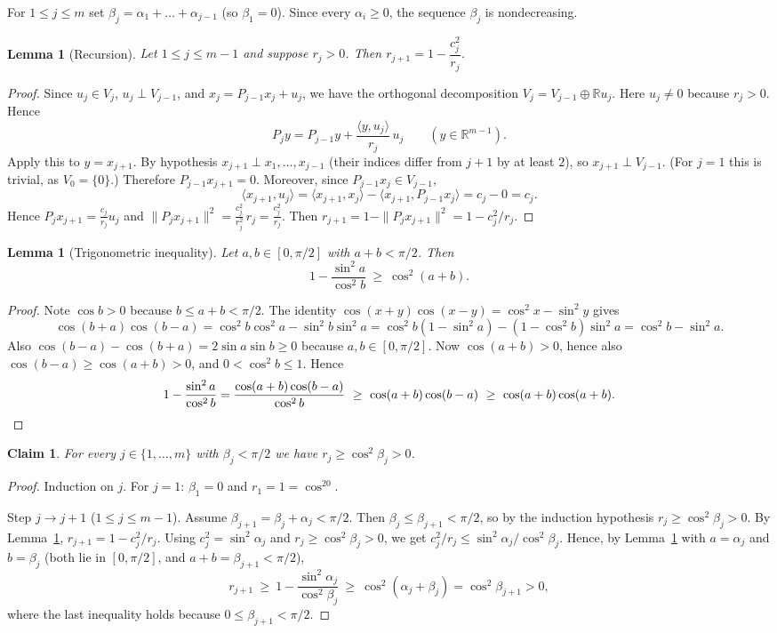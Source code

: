 \documentclass[11pt]{article}
\newtheorem{lemma}[theorem]{Lemma}
\newtheorem{claim}[theorem]{Claim}
\theoremstyle{remark}
\theoremstyle{definition}
\newcommand{\ip}[2]{\langle #1,#2\rangle}
\begin{document}
For $1\le j\le m$ set $\beta_j=\alpha_1+\dots+\alpha_{j-1}$ (so $\beta_1=0$). Since every $\alpha_i\ge0$,
the sequence $\beta_j$ is nondecreasing.

\begin{lemma}[Recursion]\label{lem:rec}
Let $1\le j\le m-1$ and suppose $r_j>0$. Then $r_{j+1}=1-\dfrac{c_j^2}{r_j}$.
\end{lemma}

\begin{proof}
Since $u_j\in V_j$, $u_j\perp V_{j-1}$, and $x_j=P_{j-1}x_j+u_j$, we have the orthogonal
decomposition $V_j=V_{j-1}\oplus\mathbb{R}u_j$. Here $u_j\ne0$ because $r_j>0$. Hence
\[
  P_jy=P_{j-1}y+\frac{\ip{y}{u_j}}{r_j}\,u_j\qquad(y\in\mathbb{R}^{m-1}).
\]
Apply this to $y=x_{j+1}$. By hypothesis $x_{j+1}\perp x_1,\dots,x_{j-1}$ (their indices differ from
$j+1$ by at least $2$), so $x_{j+1}\perp V_{j-1}$. (For $j=1$ this is trivial, as $V_0=\{0\}$.)
Therefore $P_{j-1}x_{j+1}=0$. Moreover, since $P_{j-1}x_j\in V_{j-1}$,
\[
  \ip{x_{j+1}}{u_j}=\ip{x_{j+1}}{x_j}-\ip{x_{j+1}}{P_{j-1}x_j}=c_j-0=c_j .
\]
Hence $P_jx_{j+1}=\frac{c_j}{r_j}u_j$ and $\|P_jx_{j+1}\|^2=\frac{c_j^2}{r_j^2}\,r_j=\frac{c_j^2}{r_j}$.
Then $r_{j+1}=1-\|P_jx_{j+1}\|^2=1-c_j^2/r_j$.
\end{proof}

\begin{lemma}[Trigonometric inequality]\label{lem:trig}
Let $a,b\in[0,\pi/2]$ with $a+b<\pi/2$. Then
\[
  1-\frac{\sin^2a}{\cos^2b}\ \ge\ \cos^2(a+b).
\]
\end{lemma}

\begin{proof}
Note $\cos b>0$ because $b\le a+b<\pi/2$. The identity $\cos(x+y)\cos(x-y)=\cos^2x-\sin^2y$ gives
\[
  \cos(b+a)\cos(b-a)=\cos^2b\cos^2a-\sin^2b\sin^2a
  =\cos^2b(1-\sin^2a)-(1-\cos^2b)\sin^2a=\cos^2b-\sin^2a .
\]
Also $\cos(b-a)-\cos(b+a)=2\sin a\sin b\ge0$ because $a,b\in[0,\pi/2]$. Now $\cos(a+b)>0$, hence also $\cos(b-a)\ge\cos(a+b)>0$, and
$0<\cos^2b\le1$. Hence
\[
  1-\frac{\sin^2a}{\cos^2b}=\frac{\cos(a+b)\cos(b-a)}{\cos^2b}
  \ \ge\ \cos(a+b)\cos(b-a)\ \ge\ \cos(a+b)\cos(a+b).\qedhere
\]
\end{proof}

\begin{claim}\label{cl:ind}
For every $j\in\{1,\dots,m\}$ with $\beta_j<\pi/2$ we have $r_j\ge\cos^2\beta_j>0$.
\end{claim}

\begin{proof}
Induction on $j$. For $j=1$: $\beta_1=0$ and $r_1=1=\cos^20$.

Step $j\to j+1$ ($1\le j\le m-1$). Assume $\beta_{j+1}=\beta_j+\alpha_j<\pi/2$. Then
$\beta_j\le\beta_{j+1}<\pi/2$, so by the induction hypothesis $r_j\ge\cos^2\beta_j>0$. By
Lemma~\ref{lem:rec}, $r_{j+1}=1-c_j^2/r_j$. Using $c_j^2=\sin^2\alpha_j$ and
$r_j\ge\cos^2\beta_j>0$, we get $c_j^2/r_j\le\sin^2\alpha_j/\cos^2\beta_j$. Hence, by
Lemma~\ref{lem:trig} with $a=\alpha_j$ and $b=\beta_j$ (both lie in $[0,\pi/2]$, and
$a+b=\beta_{j+1}<\pi/2$),
\[
  r_{j+1}\ \ge\ 1-\frac{\sin^2\alpha_j}{\cos^2\beta_j}\ \ge\ \cos^2(\alpha_j+\beta_j)=\cos^2\beta_{j+1}>0,
\]
where the last inequality holds because $0\le\beta_{j+1}<\pi/2$.
\end{proof}
\end{document}
